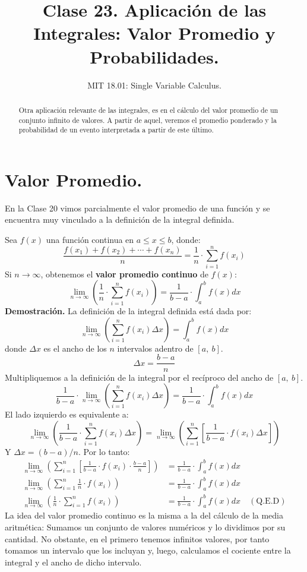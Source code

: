 \documentclass[12pt]{article}
\title{Clase 23. Aplicación de las Integrales: Valor Promedio y Probabilidades.}
\author{MIT 18.01: Single Variable Calculus.}
\date{}
\begin{document}
\maketitle

\begin{abstract}
\noindent Otra aplicación relevante de las integrales, es en el cálculo del valor promedio de un conjunto infinito de valores. A partir de aquel, veremos el promedio ponderado y la probabilidad de un evento interpretada a partir de este último.
\end{abstract}


\section{Valor Promedio.}

En la Clase 20 vimos parcialmente el valor promedio de una función y se encuentra muy vinculado a la definición de la integral definida.

Sea $f(x)$ una función continua en $a \leq x \leq b$, donde:
\[
  \frac{f(x_{1}) + f(x_{2}) + \cdots + f(x_{n})}{n} = \frac{1}{n} \cdot \sum_{i = 1}^{n} f(x_{i})
\]
Si $n \to \infty$, obtenemos el \textbf{valor promedio continuo} de $f(x)$:
\[
  \lim_{n \to \infty} \left(\frac{1}{n} \cdot \sum_{i = 1}^{n} f(x_{i}) \right) = \frac{1}{b - a} \cdot \int_{a}^{b} f(x)dx
\]
\textbf{Demostración.} La definición de la integral definida está dada por:
\[
  \lim_{n \to \infty} \left(\sum_{i = 1}^{n} f(x_{i})\Delta x\right) = \int_{a}^{b} f(x)dx
\]
donde $\Delta x$ es el ancho de los $n$ intervalos adentro de $[a, \ b]$.
\[
  \Delta x = \frac{b - a}{n}
\]
Multipliquemos a la definición de la integral por el recíproco del ancho de $[a, \ b]$.
\[
  \frac{1}{b - a} \cdot \lim_{n \to \infty} \left(\sum_{i = 1}^{n} f(x_{i})\Delta x\right) = \frac{1}{b - a} \cdot \int_{a}^{b} f(x)dx
\]
El lado izquierdo es equivalente a:
\[
  \lim_{n \to \infty} \left(\frac{1}{b - a} \cdot \sum_{i = 1}^{n} f(x_{i}) \Delta x\right) =
  \lim_{n \to \infty} \left(\sum_{i = 1}^{n} \left[\frac{1}{b - a} \cdot f(x_{i}) \Delta x \right]\right) 
\]
Y $\Delta x = (b - a)/n$. Por lo tanto:
\begin{align*}
  \lim_{n \to \infty} \left(\sum_{i = 1}^{n} \left[\frac{1}{b - a} \cdot f(x_{i}) \cdot \frac{b - a}{n}\right]\right) &=
  \frac{1}{b - a} \cdot \int_{a}^{b} f(x)dx \\
  \lim_{n \to \infty} \left(\sum_{i = 1}^{n} \frac{1}{n} \cdot f(x_{i})\right) &= \frac{1}{b - a} \cdot \int_{a}^{b} f(x)dx \\
  \lim_{n \to \infty} \left(\frac{1}{n} \cdot \sum_{i = 1}^{n} f(x_{i})\right) &= \frac{1}{b - a} \cdot \int_{a}^{b} f(x)dx \quad (\text{Q.E.D})
\end{align*}
La idea del valor promedio continuo es la misma a la del cálculo de la media aritmética: Sumamos un conjunto de valores numéricos y lo dividimos por su cantidad. No obstante, en el primero tenemos infinitos valores, por tanto tomamos un intervalo que los incluyan y, luego, calculamos el cociente entre la integral y el ancho de dicho intervalo.
\end{document}
